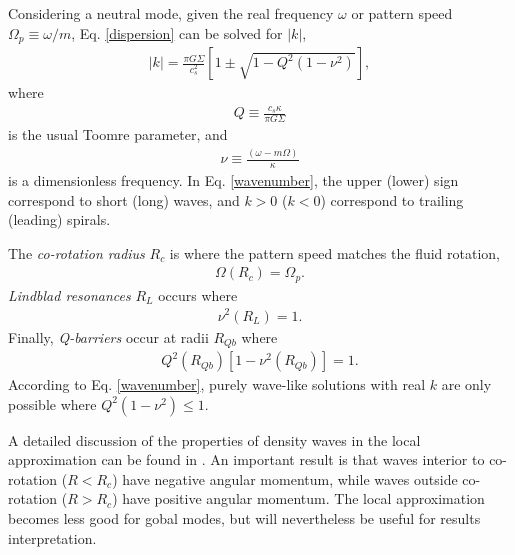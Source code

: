 Considering a neutral mode, given the real frequency $\omega$ or
pattern speed $\Omega_p\equiv 
\omega/m$, Eq. \ref{dispersion} can be solved 
for $|k|$, 
\begin{align}\label{wavenumber}
  |k| = \frac{\pi G \Sigma}{c_s^2}\left[1 \pm \sqrt{1 -
      Q^2(1-\nu^2)}\right], 
\end{align}
where 
\begin{align}
  Q \equiv \frac{c_s\kappa}{\pi G \Sigma}
\end{align}
is the usual Toomre parameter, and
\begin{align}
  \nu \equiv \frac{(\omega - m\Omega)}{\kappa}
\end{align}
is a dimensionless frequency. In
Eq. \ref{wavenumber}, the upper (lower) sign correspond to short
(long) waves, and $k>0$ ($k<0$) correspond to trailing (leading)
spirals.    

The \emph{co-rotation radius} $R_c$ is where the pattern speed matches
the fluid rotation,
\begin{align}
  \Omega(R_c) = \Omega_p.
\end{align}
\emph{Lindblad resonances} $R_L$ occurs where
\begin{align}
  \nu^2(R_L) = 1. 
\end{align}
Finally, \emph{Q-barriers} occur at radii $R_{Qb}$ where
\begin{align}
  Q^2(R_{Qb})\left[1-\nu^2(R_{Qb})\right] = 1.  
\end{align}
According to Eq. \ref{wavenumber}, purely wave-like solutions with
real $k$ are only possible where $Q^2(1-\nu^2)\leq1$.  

A detailed discussion of the properties of density waves in the local
approximation can be found in \cite{shu91}. An important result is that
waves interior to co-rotation ($R<R_c$) have negative angular momentum, while
waves outside co-rotation ($R>R_c$) have positive angular
momentum. The local approximation becomes less good for gobal modes,
but will nevertheless be useful for results interpretation.   
